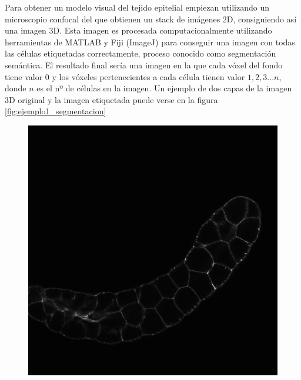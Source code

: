 Para obtener un modelo visual del tejido epitelial empiezan utilizando un microscopio confocal del que obtienen un stack de imágenes 2D, consiguiendo así una imagen 3D. Esta imagen es procesada computacionalmente utilizando herramientas de MATLAB y Fiji (ImageJ) para conseguir una imagen con todas las células etiquetadas correctamente, proceso conocido como segmentación semántica. El resultado final sería una imagen en la que cada vóxel del fondo tiene valor 0 y los vóxeles pertenecientes a cada célula tienen valor $1,2,3...n$, donde $n$ es el nº de células en la imagen. Un ejemplo de dos capas de la imagen 3D original y la imagen etiquetada puede verse en la figura \ref{fig:ejemplo1_segmentacion}

\begin{figure}[ht]
\centering
\includegraphics[scale=0.2]{img/raw 04_1a Z=77.png}
\vspace*{1mm}

\end{figure}
